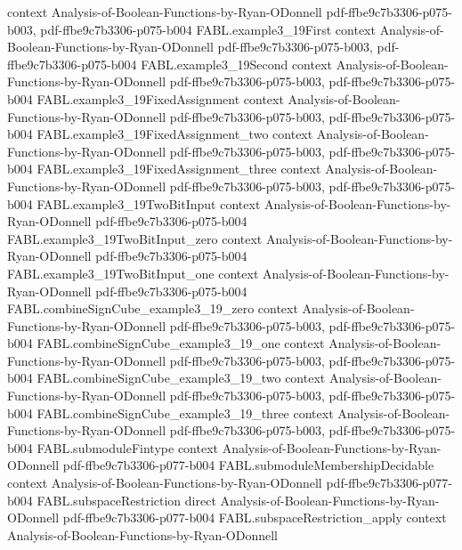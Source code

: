 \begin{theorem}
  {context}
  {Analysis-of-Boolean-Functions-by-Ryan-ODonnell}
  {pdf-ffbe9c7b3306-p075-b003,
    pdf-ffbe9c7b3306-p075-b004}
\proofstep
  {FABL.example3_19First}
  {context}
  {Analysis-of-Boolean-Functions-by-Ryan-ODonnell}
  {pdf-ffbe9c7b3306-p075-b003,
    pdf-ffbe9c7b3306-p075-b004}
\proofstep
  {FABL.example3_19Second}
  {context}
  {Analysis-of-Boolean-Functions-by-Ryan-ODonnell}
  {pdf-ffbe9c7b3306-p075-b003,
    pdf-ffbe9c7b3306-p075-b004}
\proofstep
  {FABL.example3_19FixedAssignment}
  {context}
  {Analysis-of-Boolean-Functions-by-Ryan-ODonnell}
  {pdf-ffbe9c7b3306-p075-b003,
    pdf-ffbe9c7b3306-p075-b004}
\proofstep
  {FABL.example3_19FixedAssignment_two}
  {context}
  {Analysis-of-Boolean-Functions-by-Ryan-ODonnell}
  {pdf-ffbe9c7b3306-p075-b003,
    pdf-ffbe9c7b3306-p075-b004}
\proofstep
  {FABL.example3_19FixedAssignment_three}
  {context}
  {Analysis-of-Boolean-Functions-by-Ryan-ODonnell}
  {pdf-ffbe9c7b3306-p075-b003,
    pdf-ffbe9c7b3306-p075-b004}
\proofstep
  {FABL.example3_19TwoBitInput}
  {context}
  {Analysis-of-Boolean-Functions-by-Ryan-ODonnell}
  {pdf-ffbe9c7b3306-p075-b004}
\proofstep
  {FABL.example3_19TwoBitInput_zero}
  {context}
  {Analysis-of-Boolean-Functions-by-Ryan-ODonnell}
  {pdf-ffbe9c7b3306-p075-b004}
\proofstep
  {FABL.example3_19TwoBitInput_one}
  {context}
  {Analysis-of-Boolean-Functions-by-Ryan-ODonnell}
  {pdf-ffbe9c7b3306-p075-b004}
\proofstep
  {FABL.combineSignCube_example3_19_zero}
  {context}
  {Analysis-of-Boolean-Functions-by-Ryan-ODonnell}
  {pdf-ffbe9c7b3306-p075-b003,
    pdf-ffbe9c7b3306-p075-b004}
\proofstep
  {FABL.combineSignCube_example3_19_one}
  {context}
  {Analysis-of-Boolean-Functions-by-Ryan-ODonnell}
  {pdf-ffbe9c7b3306-p075-b003,
    pdf-ffbe9c7b3306-p075-b004}
\proofstep
  {FABL.combineSignCube_example3_19_two}
  {context}
  {Analysis-of-Boolean-Functions-by-Ryan-ODonnell}
  {pdf-ffbe9c7b3306-p075-b003,
    pdf-ffbe9c7b3306-p075-b004}
\proofstep
  {FABL.combineSignCube_example3_19_three}
  {context}
  {Analysis-of-Boolean-Functions-by-Ryan-ODonnell}
  {pdf-ffbe9c7b3306-p075-b003,
    pdf-ffbe9c7b3306-p075-b004}
\proofstep
  {FABL.submoduleFintype}
  {context}
  {Analysis-of-Boolean-Functions-by-Ryan-ODonnell}
  {pdf-ffbe9c7b3306-p077-b004}
\proofstep
  {FABL.submoduleMembershipDecidable}
  {context}
  {Analysis-of-Boolean-Functions-by-Ryan-ODonnell}
  {pdf-ffbe9c7b3306-p077-b004}
\proofstep
  {FABL.subspaceRestriction}
  {direct}
  {Analysis-of-Boolean-Functions-by-Ryan-ODonnell}
  {pdf-ffbe9c7b3306-p077-b004}
\proofstep
  {FABL.subspaceRestriction_apply}
  {context}
  {Analysis-of-Boolean-Functions-by-Ryan-ODonnell}

\end{theorem}
